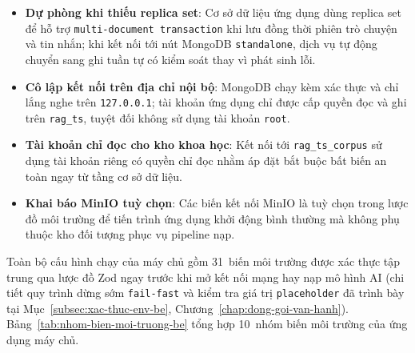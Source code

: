 \begin{itemize}
\item[--] \textbf{Dự phòng khi thiếu replica set}: Cơ sở dữ liệu ứng dụng dùng replica set để hỗ trợ \texttt{multi-document transaction} khi lưu đồng thời phiên trò chuyện và tin nhắn; khi kết nối tới nút MongoDB \texttt{standalone}, dịch vụ tự động chuyển sang ghi tuần tự có kiểm soát thay vì phát sinh lỗi.
\item[--] \textbf{Cô lập kết nối trên địa chỉ nội bộ}: MongoDB chạy kèm xác thực và chỉ lắng nghe trên \texttt{127.0.0.1}; tài khoản ứng dụng chỉ được cấp quyền đọc và ghi trên \texttt{rag\_\allowbreak{}ts}, tuyệt đối không sử dụng tài khoản \texttt{root}.
\item[--] \textbf{Tài khoản chỉ đọc cho kho khoa học}: Kết nối tới \texttt{rag\_\allowbreak{}ts\_\allowbreak{}corpus} sử dụng tài khoản riêng có quyền chỉ đọc nhằm áp đặt bắt buộc bất biến an toàn ngay từ tầng cơ sở dữ liệu.
\item[--] \textbf{Khai báo MinIO tuỳ chọn}: Các biến kết nối MinIO là tuỳ chọn trong lược đồ môi trường để tiến trình ứng dụng khởi động bình thường mà không phụ thuộc kho đối tượng phục vụ pipeline nạp.
\end{itemize}

Toàn bộ cấu hình chạy của máy chủ gồm 31~biến môi trường được xác thực tập trung qua lược đồ Zod ngay trước khi mở kết nối mạng hay nạp mô hình AI (chi tiết quy trình dừng sớm \texttt{fail-fast} và kiểm tra giá trị \texttt{placeholder} đã trình bày tại Mục~\ref{subsec:xac-thuc-env-be}, Chương~\ref{chap:dong-goi-van-hanh}). Bảng~\ref{tab:nhom-bien-moi-truong-be} tổng hợp 10~nhóm biến môi trường của ứng dụng máy chủ.

